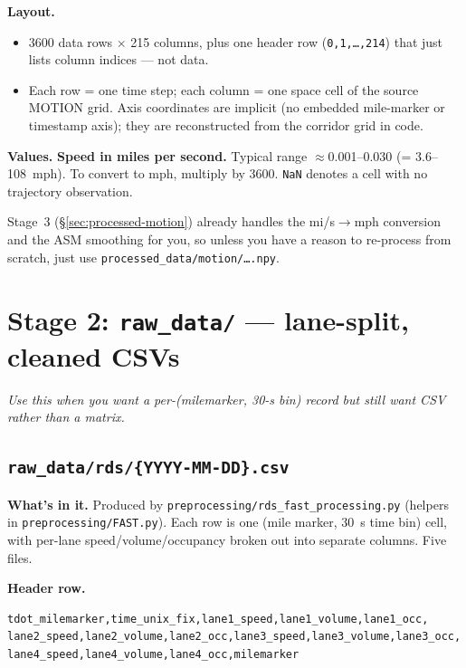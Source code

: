 \documentclass[11pt]{article}
\newcommand{\code}[1]{\texttt{#1}}
\newcommand{\nan}{\code{NaN}}
\newcommand{\filename}[1]{\textcolor{accent}{\code{#1}}}
\begin{document}
\textbf{Layout.}
\begin{itemize}[leftmargin=*]
  \item 3600 data rows $\times$ 215 columns, plus one header row
    (\code{0,1,\dots,214}) that just lists column indices --- not data.
  \item Each row = one time step; each column = one space cell of the source
    MOTION grid. Axis coordinates are implicit (no embedded mile-marker or
    timestamp axis); they are reconstructed from the corridor grid in code.
\end{itemize}

\textbf{Values.} \textbf{Speed in miles per second.} Typical range
$\approx$0.001--0.030 (= 3.6--108~mph). To convert to mph, multiply by 3600.
\nan{} denotes a cell with no trajectory observation.

\begin{tipbox}
Stage~3 (\S\ref{sec:processed-motion}) already handles the mi/s$\to$mph
conversion and the ASM smoothing for you, so unless you have a reason to
re-process from scratch, just use \filename{processed\_data/motion/\dots .npy}.
\end{tipbox}

\section{Stage 2: \texttt{raw\_data/} --- lane-split, cleaned CSVs}
\label{sec:raw-data}

\emph{Use this when you want a per-(milemarker, 30-s bin) record but still
want CSV rather than a matrix.}

\subsection{\filename{raw\_data/rds/\{YYYY-MM-DD\}.csv}}
\label{sec:raw-data-rds}

\begin{sloppypar}
\textbf{What's in it.} Produced by
\filename{preprocessing/rds\_fast\_processing.py} (helpers in
\filename{preprocessing/FAST.py}). Each row is one (mile marker, 30~s time bin)
cell, with per-lane speed/volume/occupancy broken out into separate columns.
Five files.
\end{sloppypar}

\textbf{Header row.}
\begin{lstlisting}[basicstyle=\ttfamily\scriptsize]
tdot_milemarker,time_unix_fix,lane1_speed,lane1_volume,lane1_occ,
lane2_speed,lane2_volume,lane2_occ,lane3_speed,lane3_volume,lane3_occ,
lane4_speed,lane4_volume,lane4_occ,milemarker
\end{lstlisting}
\end{document}
